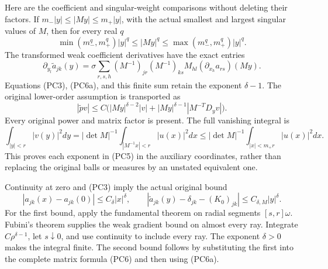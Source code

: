 \documentclass[
  11pt,
]{article}
\makeatletter
\let\ReaderOriginalAnchorStart\hyper@anchorstart
\let\ReaderOriginalAnchorEnd\hyper@anchorend
\let\ReaderPendingAliases\@empty
\def\ReaderArmAliases#1{\gdef\ReaderPendingAliases{#1}}
\def\hyper@anchorstart#1{\ReaderIfNativeAnchorTF{#1}{\ReaderPendingAliases\global\let\ReaderPendingAliases\@empty}{}\ReaderOriginalAnchorStart{#1}}
\makeatother
\begin{document}
Here are the coefficient and singular-weight comparisons without
deleting their factors. If \(m_-|y|\leq|My|\leq m_+|y|\), with the
actual smallest and largest singular values of \(M\), then for every
real \(q\) \[
 \min(m_-^q,m_+^q)|y|^q\leq|My|^q
       \leq\max(m_-^q,m_+^q)|y|^q.                    \tag{PC6a}
\] The transformed weak coefficient derivatives have the exact entries
\[
 \partial_{y_l}\widetilde a_{jk}(y)
 =\sigma\sum_{r,s,h}(M^{-1})_{jr}(M^{-1})_{ks}M_{hl}
                              (\partial_{x_h}a_{rs})(My).
                                                               \tag{PC6b}
\] Equations (PC3), (PC6a), and this finite sum retain the exponent
\(\delta-1\). The original lower-order assumption is transported as \[
 |\widetilde p v|\leq C\bigl(|My|^{\delta-2}|v|
        +|My|^{\delta-1}|M^{-T}D_yv|\bigr).             \tag{PC6c}
\] Every original power and matrix factor is present. The full vanishing
integral is \[
 \int_{|y|<r}|v(y)|^2dy
 =|\det M|^{-1}\int_{|M^{-1}x|<r}|u(x)|^2dx
 \leq|\det M|^{-1}\int_{|x|<m_+r}|u(x)|^2dx.          \tag{PC6d}
\] This proves each exponent in (PC5) in the auxiliary coordinates,
rather than replacing the original balls or measures by an unstated
equivalent one.

Continuity at zero and (PC3) imply the actual original bound \[
 |a_{jk}(x)-a_{jk}(0)|\leq C_\delta|x|^\delta,
 \qquad
 |\widetilde a_{jk}(y)-\delta_{jk}-(K_0)_{jk}|
                                  \leq C_{\delta,M}|y|^\delta.
 \tag{PC7}
\] For the first bound, apply the fundamental theorem on radial segments
\([s,r]\omega\). Fubini's theorem supplies the weak gradient bound on
almost every ray. Integrate \(C\rho^{\delta-1}\), let \(s\downarrow0\),
and use continuity to include every ray. The exponent \(\delta>0\) makes
the integral finite. The second bound follows by substituting the first
into the complete matrix formula (PC6) and then using (PC6a).

\ReaderArmAliases{\ReaderOriginalAnchorStart{AN03-PCU-002}\ReaderOriginalAnchorEnd\begingroup\expandafter\def\csname @currentHref\endcsname{AN03-PCU-002}\label{AN03-PCU-002}\endgroup\ReaderOriginalAnchorStart{an03-pcu-002-annular-control-removes-the-apparent-singularity}\ReaderOriginalAnchorEnd\begingroup\expandafter\def\csname @currentHref\endcsname{an03-pcu-002-annular-control-removes-the-apparent-singularity}\label{an03-pcu-002-annular-control-removes-the-apparent-singularity}\endgroup\ReaderOriginalAnchorStart{2-annular-control-removes-the-apparent-singularity}\ReaderOriginalAnchorEnd\begingroup\expandafter\def\csname @currentHref\endcsname{2-annular-control-removes-the-apparent-singularity}\label{2-annular-control-removes-the-apparent-singularity}\endgroup\ReaderOriginalAnchorStart{annular-control-removes-the-apparent-singularity}\ReaderOriginalAnchorEnd}
\end{document}
